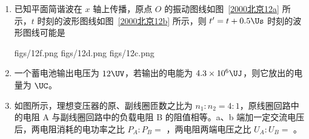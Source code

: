 \documentclass[\gkver]{gaokaozhenti}
\begin{document}
\begin{enumerate}
{若碰撞时间极短，则碰撞过程中环与板的总机械能守恒}
{环撞击板后，板的新的平衡位置与 $h$ 的大小无关}
{在碰后板和环一起下落的过程中，它们减少的动能等于克服弹簧力所作的功}


\item
已知平面简谐波在 $x$ 轴上传播，原点 $O$ 的振动图线如图~\ref{2000北京12a} 所示，$t$ 时刻的波形图线如图~\ref{2000北京12b} 所示，则 $t' = t + 0.5\Us$ 时刻的波形图线可能是 


{figs/12f.png}
{figs/12d.png}
{figs/12c.png}


\item
一个蓄电池输出电压为 $12\UV$，若输出的电能为 $4.3\times 10^{6}\UJ$，则它放出的电量为 $\UC$。



\item
如图所示，理想变压器的原、副线圈匝数之比为 $n_{1}:n_{2} = 4:1$，原线圈回路中的电阻 A 与副线圈回路中的负载电阻 B 的阻值相等。a、b 端加一定交流电压后，两电阻消耗的电功率之比 $P_{A}:P_{B} =$ ，两电阻两端电压之比 $U_{A}:U_{B} =$ 。



\end{enumerate}
\end{document}
